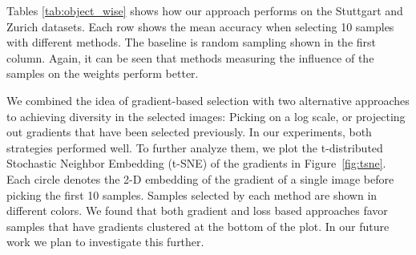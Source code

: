 \documentclass[letterpaper, 10 pt, conference]{ieeeconf}  %
\begin{document}
Tables \ref{tab:object_wise} shows how our approach performs on the Stuttgart and Zurich datasets. Each row shows the mean accuracy when selecting 10 samples with different methods. The baseline is random sampling shown in the first column. Again, it can be seen that methods measuring the influence of the samples on the weights perform better.




%
%
%
We combined the idea of gradient-based selection with two alternative approaches to achieving diversity in the selected images: Picking on a log scale, or projecting out gradients that have been selected previously. In our experiments, both strategies performed well. To further analyze them, we plot the t-distributed Stochastic Neighbor Embedding (t-SNE) of the gradients in Figure~\ref{fig:tsne}. Each circle denotes the 2-D embedding of the gradient of a single image before picking the first 10 samples. Samples selected by each method are shown in different colors. We found that both gradient and loss based approaches favor samples that have gradients clustered at the bottom of the plot. In our future work we plan to investigate this further.




\end{document}
